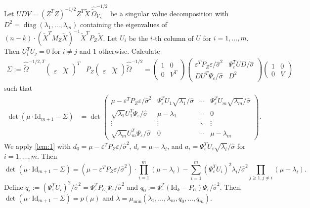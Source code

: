 \documentclass[11pt,hidelinks,a4paper]{article}
\DeclareMathOperator{\diag}{diag}
\newcommand{\Id}{\mathrm{Id}}
\let\geq\geqslant
\begin{document}
\begin{proofEnd}
    Let $U D V =  (Z^T Z)^{-1/2} Z^T \tilde X \, {\widehat{\tilde \Omega}}_{V_X}^{-1/2}$ be a singular value decomposition with $D^2 = \diag( \lambda_1, \ldots, \lambda_m )$ containing the eigenvalues of $ (n - k) \cdot (\tilde X^T M_Z \tilde X)^{-1} \tilde X^T P_Z \tilde X$.
    Let $U_i$ be the $i$-th column of $U$ for $i = 1, \ldots, m$.
    Then $U_i^T U_j = 0$ for $i \neq j$ and $1$ otherwise.
    Calculate
    \begin{align*}
       \Sigma:=\widehat{ \tilde \Omega }^{-1/2, T} \begin{pmatrix} \varepsilon & \tilde X \end{pmatrix}^T &P_Z \begin{pmatrix} \varepsilon & \tilde X \end{pmatrix} \widehat{ \tilde \Omega }^{-1/2} = 
        \begin{pmatrix} 1 & 0 \\ 0 & V^T \end{pmatrix}
        \begin{pmatrix} \varepsilon^T P_Z \varepsilon / \hat\sigma^2 & \Psi_\varepsilon^T U D / \hat\sigma \\ D U^T \Psi_\varepsilon / \hat\sigma & D^2 \end{pmatrix}
        \begin{pmatrix} 1 & 0 \\ 0 & V \end{pmatrix}
    \end{align*}
    such that
    \begin{align*}
        \det \left( \mu \cdot \Id_{m + 1} - \Sigma \right) &= \det \begin{pmatrix} \mu - \varepsilon^T P_Z \varepsilon / \hat\sigma^2 & \Psi_\varepsilon^T U_1 \sqrt{\lambda_1} /  \hat\sigma & \cdots & \Psi_\varepsilon^T U_m \sqrt{\lambda_m} /  \hat\sigma \\
            \sqrt{\lambda_1} U_1^T \Psi_\varepsilon /  \hat\sigma & \mu - \lambda_1 & \cdots & 0 \\
        \vdots & \vdots& \ddots & \vdots \\
        \sqrt{\lambda_m} U_m^T \Psi_\varepsilon /  \hat\sigma & 0 & \cdots & \mu - \lambda_m
    \end{pmatrix}.
    \end{align*}
    We apply \cref{lem:1} with $d_0 = \mu - \varepsilon^T P_Z \varepsilon / \hat\sigma^2$, $d_i = \mu - \lambda_i$, and $a_i = \Psi_\varepsilon^T U_i \sqrt{\lambda_i} / \hat \sigma$ for $i = 1, \ldots, m$.
    Then
    $$
    \det \left( \mu \cdot \Id_{m + 1} - \Sigma \right) = (\mu - \varepsilon^T P_Z \varepsilon / \hat\sigma^2) \cdot \prod_{i = 1}^m (\mu - \lambda_i) - \sum_{i = 1}^m (\Psi_\varepsilon^T U_i)^2 \lambda_i / \hat\sigma^2 \prod_{j \geq 1, j \neq i} (\mu - \lambda_i) .
    $$ 
    Define $q_i := (\Psi_\varepsilon^T U_i)^2 / \hat\sigma^2 = \Psi_\varepsilon^T P_{U_i} \Psi_\varepsilon / \hat\sigma^2$ and $q_0 := \Psi_\varepsilon^T (\Id_k - P_U) \Psi_\varepsilon / \hat\sigma^2$.
    Then, $\det\left( \mu \cdot \Id_{m + 1} - \Sigma \right) = p(\mu)$ and $\lambda = \mu_\mathrm{min}(\lambda_1, \ldots, \lambda_m, q_0, \ldots, q_m)$.


\end{proofEnd}
\end{document}
